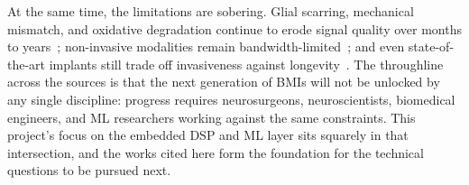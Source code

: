 \documentclass[11pt]{article}
\begin{document}
At the same time, the limitations are sobering. Glial scarring,
mechanical mismatch, and oxidative degradation continue to erode signal
quality over months to years~\cite{gao2025biocompat}; non-invasive
modalities remain bandwidth-limited~\cite{kreg2025byfounders}; and
even state-of-the-art implants still trade off invasiveness against
longevity~\cite{hoos2025columbia}. The throughline across the sources
is that the next generation of BMIs will not be unlocked by any single
discipline: progress requires neurosurgeons, neuroscientists,
biomedical engineers, and ML researchers working against the same
constraints. This project's focus on the embedded DSP and ML layer sits
squarely in that intersection, and the works cited here form the
foundation for the technical questions to be pursued next.

\end{document}
